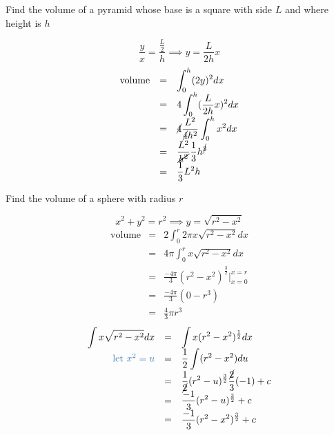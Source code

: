 \begin{eg}
Find the volume of a pyramid whose base is a square with side $L$ and where height is $h$

\soln
$$\displaystyle \frac{y}{x} = \frac{\frac{L}{2}}{h} \implies y = \frac{L}{2h}x$$
$$\begin{array}{rcl}
\text{volume} & = & \displaystyle \int_0^h (2y)^2dx\\
& = & \displaystyle 4 \int_0^h (\frac{L}{2h}x)^2 dx\\
& = & \displaystyle \cancel{4} \frac{L^2}{\cancel{4} h^2} \int_0^h x^2 dx\\
& = & \displaystyle \frac{L^2}{\cancel{h^2}} \frac{1}{3} h^{\cancel{3}}\\
& = & \displaystyle \frac{1}{3} L^2h
\end{array}$$
\end{eg}
\begin{eg}
Find the volume of a sphere with radius $r$

\soln
$$x^2 + y^2 = r^2 \implies y = \sqrt{r^2-x^2}$$
$$\begin{array}{rcl}
\text{volume} & = & \displaystyle 2 \int_0^r 2 \pi x \sqrt{r^2-x^2} dx\\
& = & \displaystyle 4 \pi \int_0^r x \sqrt{r^2-x^2}dx\\
& = & \displaystyle \frac{-4 \pi}{3}(r^2 - x^2)^{\frac{3}{2}} \Big| _{x=0}^{x=r}\\
& = & \displaystyle \frac{-4 \pi}{3}(0-r^3)\\
& = & \displaystyle \frac{4}{3}\pi r^3
\end{array}$$
$$\begin{array}{rcl}
\displaystyle \int x \sqrt{r^2-x^2} dx & = & \displaystyle \int x (r^2-x^2)^{\frac{1}{2}} dx\\
\tssteelblue{\text{let } x^2 = u} & = & \displaystyle \frac{1}{2} \int (r^2-x^2) du\\
& = & \displaystyle \frac{1}{\cancel{2}} (r^2-u)^{\frac{3}{2}} \frac{\cancel{2}}{3}(-1) + c\\
& = & \displaystyle \frac{-1}{3} (r^2-u)^{\frac{3}{2}} + c\\
& = & \displaystyle \frac{-1}{3} (r^2-x^2)^{\frac{3}{2}} + c
\end{array}$$
\end{eg}
